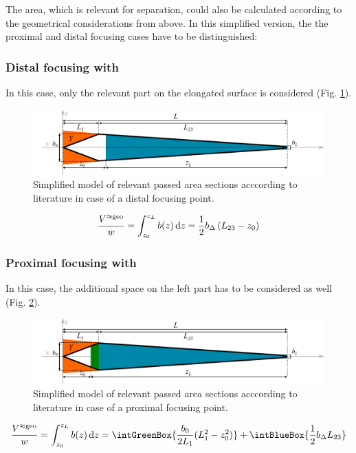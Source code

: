The area, which is relevant for separation, could also be calculated according to the geometrical considerations from 
above.
In this simplified version, the the proximal and distal focusing cases have to be distinguished:
\subsubsection*{Distal focusing with }
In this case, only the relevant part on the elongated surface is considered (Fig. \ref{fig:fffApprox1}).
\begin{figure}[h]
  \begin{center}
    \includegraphics[width=\linewidth]{./images/fffApprox1.pdf}
    \vspace*{-3ex}    
  \end{center}
  \caption[Passed area section - distal focussing, simplified approximation]{
   Simplified model of relevant passed area sections acccording to literature  in case of a distal 
   focusing 
   point. }
  \label{fig:fffApprox1} 
\end{figure}
\begin{equation}
\frac{V^{\approx\text{geo}}}{w} = 
 \int_{z_0}^{z_L} b(z) \mathop{}\!\mathrm{d} z = 
\frac{1}{2}
b_\Delta
\left( L_{23} - z_0 \right) 
\end{equation}
\FloatBarrier
\subsubsection*{Proximal focusing with }
In this case, the additional space on the left part has to be considered as well (Fig. \ref{fig:fffApprox2}).
\begin{figure}[H]
  \begin{center}
    \includegraphics[width=\linewidth]{./images/fffApprox2.pdf}
    \vspace*{-3ex}    
  \end{center}
  \caption[Passed area section - distal focussing, simplified approximation]{
    Simplified model of relevant passed area sections acccording to literature 
   in case of a proximal focusing 
    point.}
  \label{fig:fffApprox2}
\end{figure}

\begin{equation}
\frac{\Vappgeo}{w} = 
 \int_{z_0}^{\zL} b(z) \diff z = 
\intGreenBox{ \ensuremath {\frac{b_0}{2 L_1}  (L_1^2-z_0^2) }}
+ \intBlueBox{ \ensuremath { \frac{1}{2} 
    \bDelta
      L_{23} } }
\end{equation}

